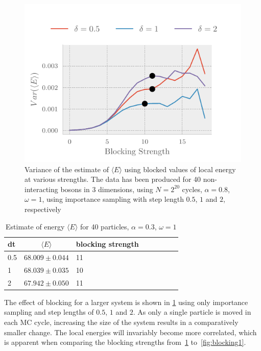 \begin{figure}[ht]
	\centering
	\includegraphics[]{figures/blocking3.pdf}
	\caption{Variance of the estimate of $\langle E\rangle$ using blocked values
      of local energy at various strengths. The data has been produced for 40
      non-interacting bosons in 3 dimensions, using $N = 2^{20}$ cycles, $\alpha =
      0.8$, $\omega = 1$, using importance sampling with step length $0.5$, $1$
      and $2$, respectively} 
	\label{fig:blocking2}
\end{figure}

\begin{table}[t]
	\begin{tabular}{lclclclc}
		\hline
		\hline
      dt & \(\langle E \rangle \)& blocking strength\\
		\hline
		0.5 & \(68.009 \pm 0.044\) & 11\\
		1 & \(68.039 \pm 0.035\) & 10\\
		2 & \(67.942 \pm 0.050\) & 11\\
		\hline
	\end{tabular}
	\caption{Estimate of energy $\langle E \rangle$ for 40 particles, $\alpha = 0.3$, $\omega = 1$}
	\label{tab:blocking}
\end{table}

The effect of blocking for a larger system is shown in
\cref{fig:blocking2} using only importance sampling and step lengths of
$0.5$, $1$ and $2$. As only a single particle is moved in each MC cycle,
increasing the size of the system results in a comparatively smaller change.
The local energies will invariably become more correlated, which is apparent
when comparing the blocking strengths from~\cref{fig:blocking2} to~\cref{fig:blocking1}.

